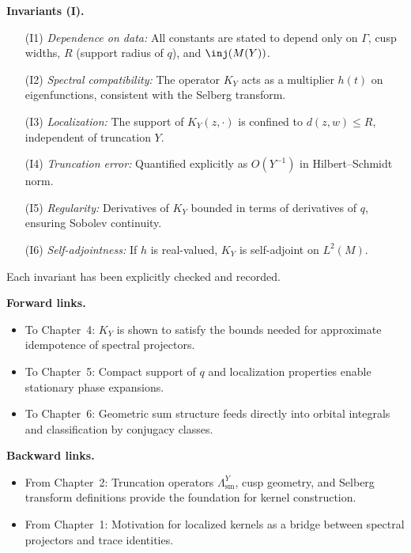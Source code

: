 \medskip

\noindent\textbf{Invariants (I).}
\begin{itemize}
  \item[(I1)] \emph{Dependence on data:} All constants are stated to depend only on $\Gamma$, cusp widths, $R$ (support radius of $q$), and $\inj(M(Y))$.
  \item[(I2)] \emph{Spectral compatibility:} The operator $K_{Y}$ acts as a multiplier $h(t)$ on eigenfunctions, consistent with the Selberg transform.
  \item[(I3)] \emph{Localization:} The support of $K_{Y}(z,\cdot)$ is confined to $d(z,w)\le R$, independent of truncation $Y$.
  \item[(I4)] \emph{Truncation error:} Quantified explicitly as $O(Y^{-1})$ in Hilbert–Schmidt norm.
  \item[(I5)] \emph{Regularity:} Derivatives of $K_{Y}$ bounded in terms of derivatives of $q$, ensuring Sobolev continuity.
  \item[(I6)] \emph{Self-adjointness:} If $h$ is real-valued, $K_{Y}$ is self-adjoint on $L^{2}(M)$.
\end{itemize}
Each invariant has been explicitly checked and recorded.

\medskip

\noindent\textbf{Forward links.}
\begin{itemize}
  \item To Chapter~4: $K_{Y}$ is shown to satisfy the bounds needed for approximate idempotence of spectral projectors.
  \item To Chapter~5: Compact support of $q$ and localization properties enable stationary phase expansions.
  \item To Chapter~6: Geometric sum structure feeds directly into orbital integrals and classification by conjugacy classes.
\end{itemize}

\medskip

\noindent\textbf{Backward links.}
\begin{itemize}
  \item From Chapter~2: Truncation operators $\Lambda^{Y}_{\mathrm{sm}}$, cusp geometry, and Selberg transform definitions provide the foundation for kernel construction.
  \item From Chapter~1: Motivation for localized kernels as a bridge between spectral projectors and trace identities.
\end{itemize}

